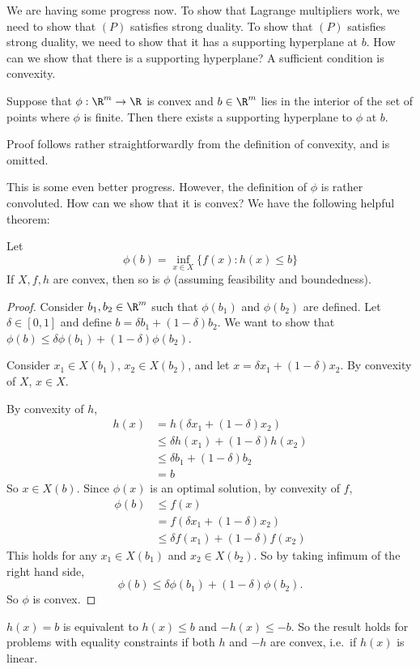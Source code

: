 \documentclass[a4paper]{article}
\begin{document}
We are having some progress now. To show that Lagrange multipliers work, we need to show that $(P)$ satisfies strong duality. To show that $(P)$ satisfies strong duality, we need to show that it has a supporting hyperplane at $b$. How can we show that there is a supporting hyperplane? A sufficient condition is convexity.

\begin{thm}
  Suppose that $\phi: \R^m \to \R$ is convex and $b\in\R^m$ lies in the interior of the set of points where $\phi$ is finite. Then there exists a supporting hyperplane to $\phi$ at $b$.
\end{thm}
Proof follows rather straightforwardly from the definition of convexity, and is omitted.

This is some even better progress. However, the definition of $\phi$ is rather convoluted. How can we show that it is convex? We have the following helpful theorem:

\begin{thm}
  Let
  \[
    \phi(b) = \inf_{x\in X} \{f(x): h(x) \leq b\}
  \]
  If $X, f, h$ are convex, then so is $\phi$ (assuming feasibility and boundedness).
\end{thm}

\begin{proof}
  Consider $b_1, b_2\in \R^m$ such that $\phi(b_1)$ and $\phi(b_2)$ are defined. Let $\delta \in [0, 1]$ and define $b = \delta b_1 + (1 - \delta)b_2$. We want to show that $\phi(b) \leq \delta \phi(b_1) + (1 - \delta)\phi(b_2)$.

  Consider $x_1 \in X(b_1)$, $x_2 \in X(b_2)$, and let $x = \delta x_1 + (1 - \delta)x_2$. By convexity of $X$, $x\in X$.

  By convexity of $h$,
  \begin{align*}
    h(x) &= h(\delta x_1 + (1 - \delta) x_2)\\
    &\leq \delta h(x_1) + (1 - \delta)h(x_2)\\
    &\leq \delta b_1 + (1 - \delta)b_2\\
    &= b
  \end{align*}
  So $x\in X(b)$. Since $\phi(x)$ is an optimal solution, by convexity of $f$,
  \begin{align*}
    \phi(b) &\leq f(x)\\
    &= f(\delta x_1 + (1 - \delta) x_2)\\
    &\leq \delta f(x_1) + (1 - \delta)f(x_2)
   \end{align*}
   This holds for any $x_1\in X(b_1)$ and $x_2 \in X(b_2)$. So by taking infimum of the right hand side,
   \[
     \phi(b) \leq \delta \phi(b_1) + (1 - \delta) \phi(b_2).
   \]
   So $\phi$ is convex.
\end{proof}
$h(x) = b$ is equivalent to $h(x) \leq b$ and $-h(x) \leq -b$. So the result holds for problems with equality constraints if both $h$ and $-h$ are convex, i.e.\ if $h(x)$ is linear.
\end{document}
